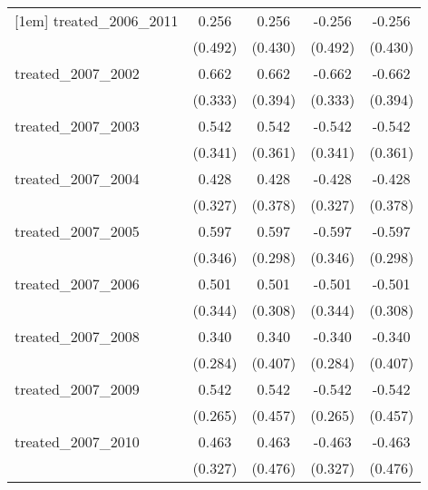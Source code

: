 {\begin{tabular}{l*{4}{c}}
[1em]
treated\_2006\_2011&       0.256         &       0.256         &      -0.256         &      -0.256         \\
            &     (0.492)         &     (0.430)         &     (0.492)         &     (0.430)         \\
[1em]
treated\_2007\_2002&       0.662\sym{*}  &       0.662         &      -0.662\sym{*}  &      -0.662         \\
            &     (0.333)         &     (0.394)         &     (0.333)         &     (0.394)         \\
[1em]
treated\_2007\_2003&       0.542         &       0.542         &      -0.542         &      -0.542         \\
            &     (0.341)         &     (0.361)         &     (0.341)         &     (0.361)         \\
[1em]
treated\_2007\_2004&       0.428         &       0.428         &      -0.428         &      -0.428         \\
            &     (0.327)         &     (0.378)         &     (0.327)         &     (0.378)         \\
[1em]
treated\_2007\_2005&       0.597         &       0.597\sym{*}  &      -0.597         &      -0.597\sym{*}  \\
            &     (0.346)         &     (0.298)         &     (0.346)         &     (0.298)         \\
[1em]
treated\_2007\_2006&       0.501         &       0.501         &      -0.501         &      -0.501         \\
            &     (0.344)         &     (0.308)         &     (0.344)         &     (0.308)         \\
[1em]
treated\_2007\_2008&       0.340         &       0.340         &      -0.340         &      -0.340         \\
            &     (0.284)         &     (0.407)         &     (0.284)         &     (0.407)         \\
[1em]
treated\_2007\_2009&       0.542\sym{*}  &       0.542         &      -0.542\sym{*}  &      -0.542         \\
            &     (0.265)         &     (0.457)         &     (0.265)         &     (0.457)         \\
[1em]
treated\_2007\_2010&       0.463         &       0.463         &      -0.463         &      -0.463         \\
            &     (0.327)         &     (0.476)         &     (0.327)         &     (0.476)         \\

\end{tabular}}
